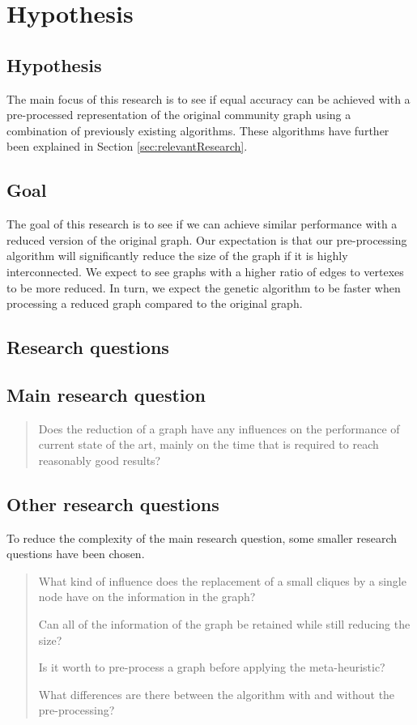 \section{Hypothesis}
\label{sec:hypothesis}

\subsection{Hypothesis}
The main focus of this research is to see if equal accuracy can be achieved with a pre-processed representation of the original community graph using a combination of previously existing algorithms.
These algorithms have further been explained in Section \ref{sec:relevantResearch}.

\subsection{Goal}
The goal of this research is to see if we can achieve similar performance with a reduced version of the original graph. 
Our expectation is that our pre-processing algorithm will significantly reduce the size of the graph if it is highly interconnected. 
We expect to see graphs with a higher ratio of edges to vertexes to be more reduced. 
In turn, we expect the genetic algorithm to be faster when processing a reduced graph compared to the original graph.

\subsection{Research questions}
\subsection*{Main research question}
\begin{quote}
Does the reduction of a graph have any influences on the performance of current state of the art, mainly on the time that is required to reach reasonably good results?
\end{quote}
\subsection*{Other research questions}
To reduce the complexity of the main research question, some smaller research questions have been chosen.
\begin{quote}
What kind of influence does the replacement of a small cliques by a single node have on the information in the graph?

Can all of the information of the graph be retained while still reducing the size?

Is it worth to pre-process a graph before applying the meta-heuristic?

What differences are there between the algorithm with and without the pre-processing?
\end{quote}
